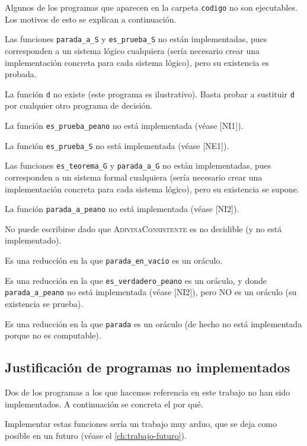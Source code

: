 Algunos de los programas que aparecen en la carpeta \texttt{codigo} no son ejecutables. Los motivos de esto se explican a continuación.

\begin{enumerate}[label={[}NE\arabic*{]},wide = 0pt,widest={100}, leftmargin =*]
    \item Las funciones \texttt{parada\_a\_S} y \texttt{es\_prueba\_S} no están implementadas, pues corresponden a un sistema lógico cualquiera (sería necesario crear una implementación concreta para cada sistema lógico), pero su existencia es probada.
    \item La función \texttt{d} no existe (este programa es ilustrativo). Basta probar a sustituir \texttt{d} por cualquier otro programa de decisión.
    \item La función \texttt{es\_prueba\_peano} no está implementada (véase [NI1]).
    \item La función \texttt{es\_prueba\_S} no está implementada (véase [NE1]).
    \item Las funciones \texttt{es\_teorema\_G} y \texttt{parada\_a\_G} no están implementadas, pues corresponden a un sistema formal cualquiera (sería necesario crear una implementación concreta para cada sistema lógico), pero su existencia se supone.
    \item La función \texttt{parada\_a\_peano} no está implementada (véase [NI2]).
    \item No puede escribirse dado que \textsc{AdivinaConsistente} es no decidible (y no está implementado).
    \item Es una reducción en la que \texttt{parada\_en\_vacio} es un oráculo.
    \item Es una reducción en la que \texttt{es\_verdadero\_peano} es un oráculo, y donde \texttt{parada\_a\_peano} no está implementada (véase [NI2]), pero NO es un oráculo (su existencia se prueba).
    \item Es una reducción en la que \texttt{parada} es un oráculo (de hecho no está implementada porque no es computable).
\end{enumerate}

\subsection*{Justificación de programas no implementados}

Dos de los programas a los que hacemos referencia en este trabajo no han sido implementados. A continuación se concreta el por qué.

\begin{enumerate}[label={[}NI\arabic*{]},wide = 0pt,widest={NI1,NI}, leftmargin =*]
    \item[{[}NI1, NI2{]}] Implementar estas funciones sería un trabajo muy arduo, que se deja como posible en un futuro (véase el \cref{ch:trabajo-futuro}).
\end{enumerate}

\endinput
